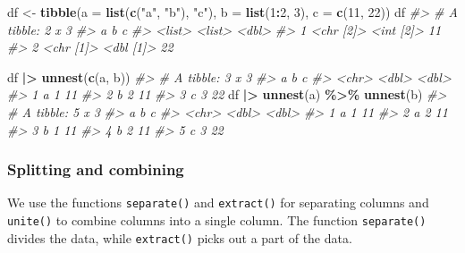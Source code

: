 \documentclass[
]{book}
\newenvironment{Shaded}{\begin{snugshade}}{\end{snugshade}}
\newcommand{\AttributeTok}[1]{\textcolor[rgb]{0.13,0.29,0.53}{#1}}
\newcommand{\CommentTok}[1]{\textcolor[rgb]{0.56,0.35,0.01}{\textit{#1}}}
\newcommand{\DecValTok}[1]{\textcolor[rgb]{0.00,0.00,0.81}{#1}}
\newcommand{\FunctionTok}[1]{\textcolor[rgb]{0.13,0.29,0.53}{\textbf{#1}}}
\newcommand{\NormalTok}[1]{#1}
\newcommand{\OtherTok}[1]{\textcolor[rgb]{0.56,0.35,0.01}{#1}}
\newcommand{\SpecialCharTok}[1]{\textcolor[rgb]{0.81,0.36,0.00}{\textbf{#1}}}
\newcommand{\StringTok}[1]{\textcolor[rgb]{0.31,0.60,0.02}{#1}}
\begin{document}
\begin{Shaded}
\begin{Highlighting}[]
\NormalTok{df }\OtherTok{\textless{}{-}} \FunctionTok{tibble}\NormalTok{(}\AttributeTok{a =} \FunctionTok{list}\NormalTok{(}\FunctionTok{c}\NormalTok{(}\StringTok{"a"}\NormalTok{, }\StringTok{"b"}\NormalTok{), }\StringTok{"c"}\NormalTok{),}
             \AttributeTok{b =} \FunctionTok{list}\NormalTok{(}\DecValTok{1}\SpecialCharTok{:}\DecValTok{2}\NormalTok{, }\DecValTok{3}\NormalTok{),}
             \AttributeTok{c =} \FunctionTok{c}\NormalTok{(}\DecValTok{11}\NormalTok{, }\DecValTok{22}\NormalTok{))}
\NormalTok{df}
\CommentTok{\#\textgreater{} \# A tibble: 2 x 3}
\CommentTok{\#\textgreater{}   a         b             c}
\CommentTok{\#\textgreater{}   \textless{}list\textgreater{}    \textless{}list\textgreater{}    \textless{}dbl\textgreater{}}
\CommentTok{\#\textgreater{} 1 \textless{}chr [2]\textgreater{} \textless{}int [2]\textgreater{}    11}
\CommentTok{\#\textgreater{} 2 \textless{}chr [1]\textgreater{} \textless{}dbl [1]\textgreater{}    22}
  
\NormalTok{df }\SpecialCharTok{|\textgreater{}} \FunctionTok{unnest}\NormalTok{(}\FunctionTok{c}\NormalTok{(a, b))}
\CommentTok{\#\textgreater{} \# A tibble: 3 x 3}
\CommentTok{\#\textgreater{}   a         b     c}
\CommentTok{\#\textgreater{}   \textless{}chr\textgreater{} \textless{}dbl\textgreater{} \textless{}dbl\textgreater{}}
\CommentTok{\#\textgreater{} 1 a         1    11}
\CommentTok{\#\textgreater{} 2 b         2    11}
\CommentTok{\#\textgreater{} 3 c         3    22}
\NormalTok{df }\SpecialCharTok{|\textgreater{}} \FunctionTok{unnest}\NormalTok{(a) }\SpecialCharTok{\%\textgreater{}\%} \FunctionTok{unnest}\NormalTok{(b)}
\CommentTok{\#\textgreater{} \# A tibble: 5 x 3}
\CommentTok{\#\textgreater{}   a         b     c}
\CommentTok{\#\textgreater{}   \textless{}chr\textgreater{} \textless{}dbl\textgreater{} \textless{}dbl\textgreater{}}
\CommentTok{\#\textgreater{} 1 a         1    11}
\CommentTok{\#\textgreater{} 2 a         2    11}
\CommentTok{\#\textgreater{} 3 b         1    11}
\CommentTok{\#\textgreater{} 4 b         2    11}
\CommentTok{\#\textgreater{} 5 c         3    22}
\end{Highlighting}
\end{Shaded}

\subsubsection{Splitting and combining}\label{splitting-and-combining}

We use the functions \texttt{separate()} and \texttt{extract()} for separating columns and \texttt{unite()} to combine columns into a single column. The function \texttt{separate()} divides the data, while \texttt{extract()} picks out a part of the data.
\end{document}
